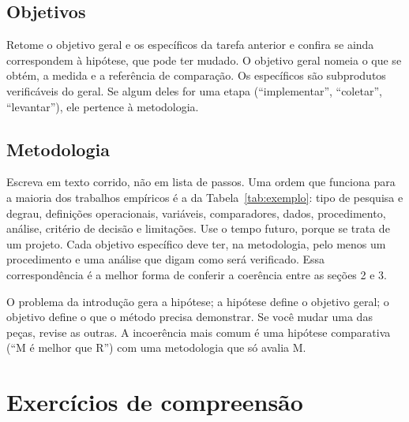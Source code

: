 \documentclass[10pt,a4paper]{extarticle}
\theoremstyle{definition}
\begin{document}
\subsection{Objetivos}

Retome o objetivo geral e os específicos da tarefa anterior e confira se ainda correspondem à hipótese, que pode ter mudado. O objetivo geral nomeia o que se obtém, a medida e a referência de comparação. Os específicos são subprodutos verificáveis do geral. Se algum deles for uma etapa (\enquote{implementar}, \enquote{coletar}, \enquote{levantar}), ele pertence à metodologia.

\subsection{Metodologia}

Escreva em texto corrido, não em lista de passos. Uma ordem que funciona para a maioria dos trabalhos empíricos é a da Tabela~\ref{tab:exemplo}: tipo de pesquisa e degrau, definições operacionais, variáveis, comparadores, dados, procedimento, análise, critério de decisão e limitações. Use o tempo futuro, porque se trata de um projeto. Cada objetivo específico deve ter, na metodologia, pelo menos um procedimento e uma análise que digam como será verificado. Essa correspondência é a melhor forma de conferir a coerência entre as seções 2 e 3.

\begin{warnbox}
O problema da introdução gera a hipótese; a hipótese define o objetivo geral; o objetivo define o que o método precisa demonstrar. Se você mudar uma das peças, revise as outras. A incoerência mais comum é uma hipótese comparativa (\enquote{M é melhor que R}) com uma metodologia que só avalia M.
\end{warnbox}

\section*{Exercícios de compreensão}
\end{document}
